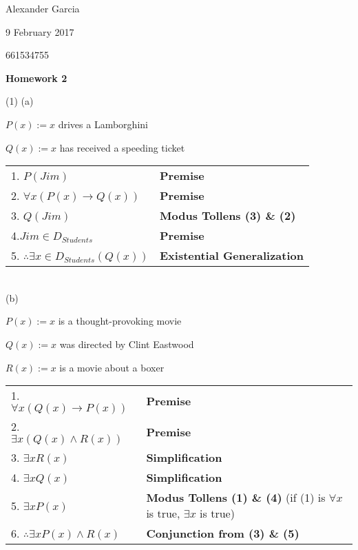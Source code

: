 \documentclass[]{article}
\def\AND{\wedge}
\def\imp{\rightarrow}
\begin{document}
Alexander Garcia

9 February 2017

661534755

\centerline{\bf \Large Homework 2}

\medskip

\noindent (1) (a) 

$P(x) := x$ drives a Lamborghini

$Q(x) := x$ has received a speeding ticket \\

\begin{tabular}{ l l }

	1. $P(Jim)$ & \textbf{Premise} \\

	2. $\forall x (P(x) \imp Q(x))$ & \textbf{Premise} \\

	3. $Q(Jim)$ & \textbf{Modus Tollens (3) \& (2)} \\

	4.$Jim \in D_{Students}$ & \textbf{Premise} \\

	5. $\therefore \exists x \in D_{Students} (Q(x))$ & \textbf{Existential Generalization}\\
	
\end{tabular} \\

(b)

$P(x) := x$ is a thought-provoking movie

$Q(x) := x$ was directed by Clint Eastwood

$R(x) := x$ is a movie about a boxer \\

\begin{tabular}{l l}

	1. $\forall x (Q(x) \imp P(x))$ & \textbf{Premise} \\

	2. $\exists x (Q(x) \AND R(x))$ & \textbf{Premise} \\

	3. $\exists x R(x)$ & \textbf{Simplification} \\

	4. $\exists x Q(x)$ & \textbf{Simplification} \\

	5. $\exists x P(x)$ & \textbf{Modus Tollens (1) \& (4)} (if (1) is $\forall x$ is true, $\exists x$ is true) \\

	6. $\therefore \exists x P(x) \AND R(x)$ & \textbf{Conjunction from (3) \& (5)} \\

\end{tabular} \\
\end{document}
